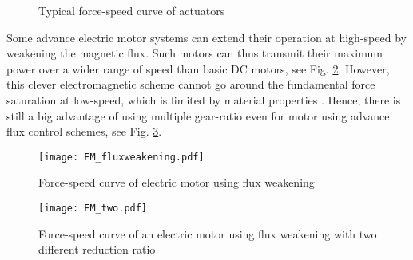 \begin{figure}[htb]
        \centering
        \caption{Typical force-speed curve of actuators}\label{fig:powercurves}
\end{figure}

Some advance electric motor systems can extend their operation at high-speed by weakening the magnetic flux. Such motors can thus transmit their maximum power over a wider range of speed than basic DC motors, see Fig. \ref{fig:EM_fluxweakening}. However, this clever electromagnetic scheme cannot go around the fundamental force saturation at low-speed, which is limited by material properties \cite{hollerbach_comparative_1992}. Hence, there is still a big advantage of using multiple gear-ratio even for motor using advance flux control schemes, see Fig. \ref{fig:EM_two}. 

\begin{figure}[ht]
	\centering
		\texttt{[image: EM\_fluxweakening.pdf]}
	\caption{Force-speed curve of electric motor using flux weakening }
	\label{fig:EM_fluxweakening}
\end{figure}

\begin{figure}[ht]
	\centering
		\texttt{[image: EM\_two.pdf]}
	\caption[Two-speed electric motor using flux weakening]{Force-speed curve of an electric motor using flux weakening with two different reduction ratio}
	\label{fig:EM_two}
\end{figure}


